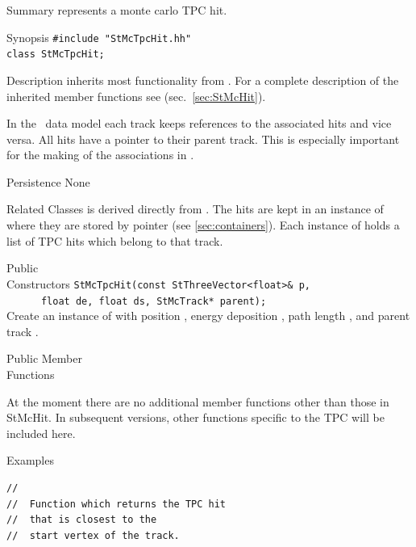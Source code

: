 \begin{Entry}
\item[Summary]
     represents a monte carlo TPC hit.

\item[Synopsis]
    \verb+#include "StMcTpcHit.hh"+\\
    \verb+class StMcTpcHit;+\\

\item[Description]
     inherits most functionality from .
    For a complete description of the inherited member functions see
     (sec.~\ref{sec:StMcHit}).

    In the \StMcEvent\ data model each track keeps references to the
    associated hits and vice versa. All hits have a pointer to their
    parent track.  This is especially important for the making of the
    associations in \StAssociationMaker.

\item[Persistence]
    None

\item[Related Classes]
     is derived directly from .
    The hits are kept in an instance of 
    where they are stored by pointer (see \ref{sec:containers}).
    Each instance of  holds a list of TPC hits
    which belong to that track.

\item[Public\\ Constructors]
    \verb+StMcTpcHit(const StThreeVector<float>& p,+\\
    \verb+      float de, float ds, StMcTrack* parent);+\\
    
    Create an instance of  with position ,
    energy deposition , path length , and parent track .

\item[Public Member\\ Functions]

    At the moment there are no additional member functions other
    than those in StMcHit.  In subsequent versions, other functions
    specific to the TPC will be included here.

\item[Examples]   
{\footnotesize
\begin{verbatim}
//
//  Function which returns the TPC hit
//  that is closest to the
//  start vertex of the track.


\end{verbatim}}
\end{Entry}
